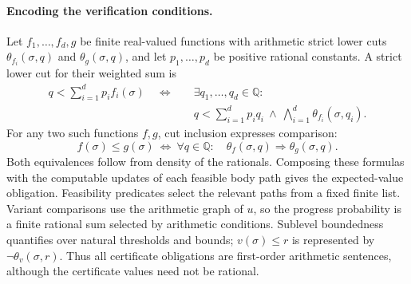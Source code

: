 \paragraph{Encoding the verification conditions.}
\label{app:arithmetic-obligations}
Let $f_1,\ldots,f_d,g$ be finite real-valued functions with arithmetic
strict lower cuts $\theta_{f_i}(\sigma,q)$ and $\theta_g(\sigma,q)$,
and let $p_1,\ldots,p_d$ be positive rational constants. A strict lower
cut for their weighted sum is
\[
 \begin{aligned}
 q<\sum_{i=1}^d p_i f_i(\sigma)
 \quad\Longleftrightarrow\quad
 &\exists q_1,\ldots,q_d\in\mathbb Q:\\
 &q<\sum_{i=1}^d p_iq_i\ \land\
 \bigwedge_{i=1}^d\theta_{f_i}(\sigma,q_i).
 \end{aligned}
\]
For any two such functions $f,g$, cut inclusion expresses comparison:
\[
 f(\sigma)\leq g(\sigma)
 \ \Longleftrightarrow\
 \forall q\in\mathbb Q:
 \quad\theta_f(\sigma,q)\Longrightarrow\theta_g(\sigma,q).
\]
Both equivalences follow from density of the rationals. Composing these
formulas with the computable updates of each feasible body path gives
the expected-value obligation. Feasibility predicates select the relevant
paths from a fixed finite list. Variant comparisons use the arithmetic
graph of $u$, so the progress probability is a finite rational sum
selected by arithmetic conditions. Sublevel boundedness quantifies over
natural thresholds and bounds; $v(\sigma)\leq r$ is represented by
$\neg\theta_v(\sigma,r)$. Thus all certificate obligations are first-order
arithmetic sentences, although the certificate values need not be rational.

